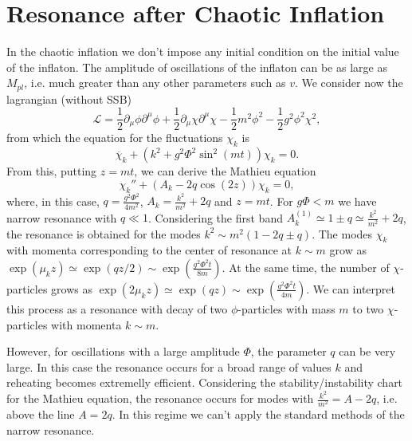 \documentclass[11pt,a4paper,twoside]{book}
\begin{document}
 \section{Resonance after Chaotic Inflation}
 In the chaotic inflation we don't  impose any initial condition on the initial value of the inflaton. The amplitude  of oscillations of the inflaton can be as large as $ M_{pl} $, i.e. much greater than any other parameters such as $ v $. We consider now the lagrangian (without SSB)
 \begin{equation}
 	\label{Chap4:potentialChaoticInflation}
 	\mathcal{L}=\frac{1}{2}\partial_{\mu}\phi\partial^{\mu}\phi + \frac{1}{2}\partial_{\mu}\chi\partial^{\mu}\chi - \frac{1}{2}m^{2}\phi^{2} - \frac{1}{2}g^{2}\phi^{2}\chi^{2},
 \end{equation}
from which the equation for the fluctuations $ \chi_{k} $ is
 \begin{equation}
 	\label{Chap4:eqFluctuationChaoticModel}
 	\ddot{\chi_{k}} + (k^{2} + g^{2}\Phi^{2}\sin^{2}(mt))\chi_{k}=0.
 \end{equation}
From this, putting $ z=mt $, we can derive the Mathieu equation 
\begin{equation}
	\label{Chap4:eqMotionChi}
	\chi_{k}'' + (A_{k} - 2q\cos(2z))\chi_{k}=0,
\end{equation}
where, in this case, $ q=\frac{g^{2}\Phi^{2}}{4m^{2}} $,  $ A_{k} = \frac{k^{2}}{m^{2}} + 2q  $ and $ z=mt $. For $ g\Phi < m $ we have  narrow resonance with $ q \ll 1 $. Considering the first band $ A_{k}^{(1)}\simeq 1\pm q \simeq \frac{k^{2}}{m^{2}} + 2q $, the resonance is obtained for the modes $ k^{2}\sim m^{2}(1-2q \pm q) $. The modes $\chi_{k}$ with momenta corresponding  to the center of resonance at $ k \sim m $ grow as $\exp(\mu_{k}z)\simeq \exp(qz/2)\sim \exp(\frac{g^{2}\Phi^{2}t}{8m})$. At the same time, the number of $\chi$-particles grows as $\exp(2\mu_{k}z) \simeq\exp(qz) \sim \exp(\frac{g^{2}\Phi^{2}t}{4m})$. We can interpret this process as a resonance with decay of two $ \phi $-particles with mass $ m $ to two $\chi$-particles with momenta $ k\sim m $.

However, for oscillations with a large amplitude $\Phi$, the parameter $ q $ can be very large. In this case the resonance occurs for a broad range of values $ k $ and reheating becomes extremelly efficient. Considering the stability/instability chart for the Mathieu equation, the resonance occurs for modes  with $ \frac{k^{2}}{m^{2}}=A-2q $, i.e. above the line $ A=2q $. In this regime we can't apply the standard methods of the narrow resonance.
\end{document}
